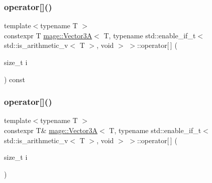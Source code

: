 \subsubsection{\texorpdfstring{operator[]()}{operator[]()}\hspace{0.1cm}{\footnotesize\ttfamily [1/2]}}
{\footnotesize\ttfamily template$<$typename T $>$ \\
constexpr T \hyperlink{structmage_1_1_vector3_a}{mage\+::\+Vector3A}$<$ T, typename std\+::enable\+\_\+if\+\_\+t$<$ std\+::is\+\_\+arithmetic\+\_\+v$<$ T $>$, void $>$ $>$\+::operator\mbox{[}$\,$\mbox{]} (\begin{DoxyParamCaption}\item[{size\+\_\+t}]{i }\end{DoxyParamCaption}) const\hspace{0.3cm}{\ttfamily [noexcept]}}

\hypertarget{structmage_1_1_vector3_a_3_01_t_00_01typename_01std_1_1enable__if__t_3_01std_1_1is__arithmetic__7070ab83646a86866d1e3c9d7eeea37a_aaae2f3cde35e57c32ff0ef7cbe1aa20e}{}\label{structmage_1_1_vector3_a_3_01_t_00_01typename_01std_1_1enable__if__t_3_01std_1_1is__arithmetic__7070ab83646a86866d1e3c9d7eeea37a_aaae2f3cde35e57c32ff0ef7cbe1aa20e} 
\subsubsection{\texorpdfstring{operator[]()}{operator[]()}\hspace{0.1cm}{\footnotesize\ttfamily [2/2]}}
{\footnotesize\ttfamily template$<$typename T $>$ \\
constexpr T\& \hyperlink{structmage_1_1_vector3_a}{mage\+::\+Vector3A}$<$ T, typename std\+::enable\+\_\+if\+\_\+t$<$ std\+::is\+\_\+arithmetic\+\_\+v$<$ T $>$, void $>$ $>$\+::operator\mbox{[}$\,$\mbox{]} (\begin{DoxyParamCaption}\item[{size\+\_\+t}]{i }\end{DoxyParamCaption})\hspace{0.3cm}{\ttfamily [noexcept]}}




